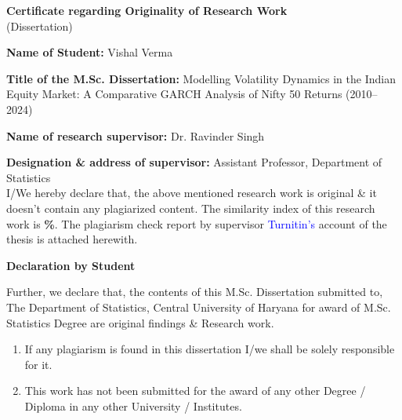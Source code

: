 \newpage
\begin{center}
    \textbf{Certificate regarding Originality of Research Work} \\
    (Dissertation)
\end{center}

\vspace{0.5cm}

\textbf{Name of Student:} Vishal Verma

\vspace{0.2cm}
\textbf{Title of the M.Sc. Dissertation:} {Modelling Volatility Dynamics in the Indian Equity Market: A Comparative GARCH Analysis of Nifty 50 Returns (2010--2024)}

\vspace{0.2cm}
\textbf{Name of research supervisor:} Dr. Ravinder Singh

\vspace{0.2cm}
\textbf{Designation \& address of supervisor:} Assistant Professor, Department of Statistics\\
\vspace{0.3cm}
I/We hereby declare that, the above mentioned research work is original \& it doesn’t contain any plagiarized content. The similarity index of this research work is \textbf{\%}. The plagiarism check report by supervisor \textcolor{blue}{Turnitin’s} account of the thesis is attached herewith.
\begin{center}
    \textbf{Declaration by Student}
\end{center}
Further, we declare that, the contents of this M.Sc. Dissertation submitted to, The Department of Statistics, Central University of Haryana for award of M.Sc. Statistics Degree are original findings \& Research work.
\begin{enumerate}
    \item If any plagiarism is found in this dissertation I/we shall be solely responsible for it.
    \item This work has not been submitted for the award of any other Degree / Diploma in any other University / Institutes.
\end{enumerate}

